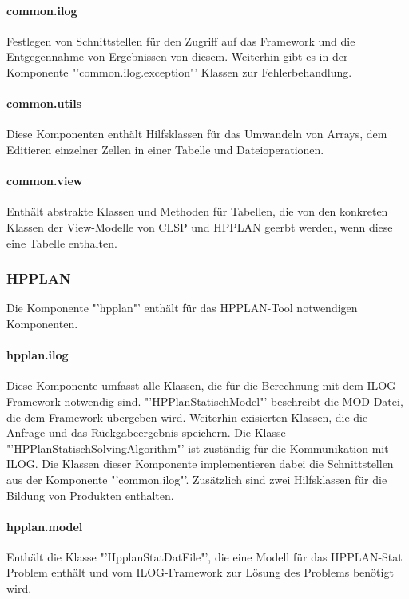 \documentclass[12pt,a4paper, listof=entryprefix, bibliography=totocnumbered,toc=listofnumbered,lof=listofnumbered]{scrartcl}
\begin{document}
\paragraph{common.ilog}
Festlegen von Schnittstellen für den Zugriff auf das Framework und die Entgegennahme von Ergebnissen von diesem. Weiterhin gibt es in der Komponente "'common.ilog.exception"' Klassen zur Fehlerbehandlung.

\paragraph{common.utils}
Diese Komponenten enthält Hilfsklassen für das Umwandeln von Arrays, dem Editieren einzelner Zellen in einer Tabelle und Dateioperationen.

\paragraph{common.view}
Enthält abstrakte Klassen und Methoden für Tabellen, die von den konkreten Klassen der View-Modelle von CLSP und HPPLAN geerbt werden, wenn diese eine Tabelle enthalten.

\subsubsection{HPPLAN}
Die Komponente "'hpplan"' enthält für das HPPLAN-Tool notwendigen Komponenten.

\paragraph{hpplan.ilog}
Diese Komponente umfasst alle Klassen, die für die Berechnung mit dem ILOG-Framework notwendig sind. "'HPPlanStatischModel"' beschreibt die MOD-Datei, die dem Framework übergeben wird. Weiterhin exisierten Klassen, die die Anfrage und das Rückgabeergebnis speichern. Die Klasse "'HPPlanStatischSolvingAlgorithm"' ist zuständig für die Kommunikation mit ILOG. Die Klassen dieser Komponente implementieren dabei die Schnittstellen aus der Komponente "'common.ilog"'. Zusätzlich sind zwei Hilfsklassen für die Bildung von Produkten enthalten.

\paragraph{hpplan.model}
Enthält die Klasse "'HpplanStatDatFile"', die eine Modell für das HPPLAN-Stat Problem enthält und vom ILOG-Framework zur Lösung des Problems benötigt wird.
\end{document}
